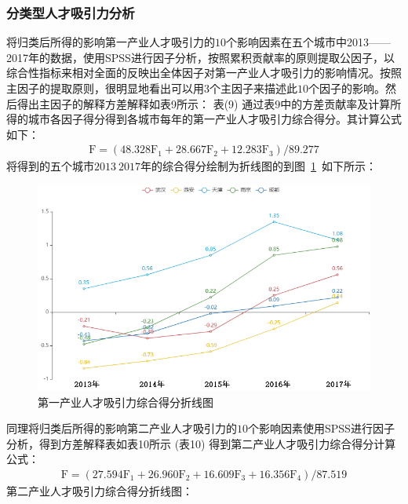 \documentclass{whutmod}
\begin{document}
	\subsubsection{分类型人才吸引力分析}
	将归类后所得的影响第一产业人才吸引力的$10$个影响因素在五个城市中2013——2017年的数据，使用SPSS进行因子分析，按照累积贡献率的原则提取公因子，以综合性指标来相对全面的反映出全体因子对第一产业人才吸引力的影响情况。按照主因子的提取原则，很明显地看出可以用$3$个主因子来描述此$10$个因子的影响。然后得出主因子的解释方差解释如表9所示：
	表(9)
	通过表$9$中的方差贡献率及计算所得的城市各因子得分得到各城市每年的第一产业人才吸引力综合得分。其计算公式如下：
	\begin{gather}
	\mathrm { F } = \left( 48.328 \mathrm { F } _ { 1 } + 28.667 \mathrm { F } _ { 2 } + 12.283 \mathrm { F } _ { 3 } \right) / 89.277
	\end{gather}
	将得到的五个城市$2013~2017$年的综合得分绘制为折线图的到图~\ref{11}~如下所示：
	\begin{figure}[H]
		\centering
		\includegraphics[width=\textwidth]{figures/11.png}
		\caption{第一产业人才吸引力综合得分折线图}\label{11}
	\end{figure} 
	同理将归类后所得的影响第二产业人才吸引力的$10$个影响因素使用SPSS进行因子分析，得到方差解释表如表10所示
	(表10)
	得到第二产业人才吸引力综合得分计算公式：
	\begin{gather}
	\mathrm { F } = \left( 27.594 \mathrm { F } _ { 1 } + 26.960 \mathrm { F } _ { 2 } + 16.609 \mathrm { F } _ { 3 } + 16.356 \mathrm { F } _ { 4 } \right) / 87.519
	\end{gather}
	第二产业人才吸引力综合得分折线图：
\end{document}

